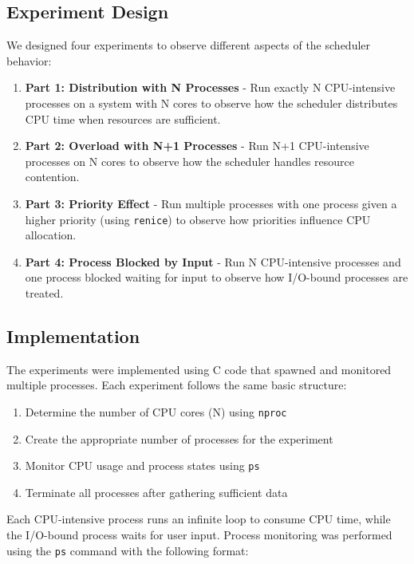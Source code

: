 \documentclass[12pt,a4paper]{article}
\begin{document}
\subsection{Experiment Design}

We designed four experiments to observe different aspects of the scheduler behavior:

\begin{enumerate}
    \item \textbf{Part 1: Distribution with N Processes} - Run exactly N CPU-intensive processes on a system with N cores to observe how the scheduler distributes CPU time when resources are sufficient.
    
    \item \textbf{Part 2: Overload with N+1 Processes} - Run N+1 CPU-intensive processes on N cores to observe how the scheduler handles resource contention.
    
    \item \textbf{Part 3: Priority Effect} - Run multiple processes with one process given a higher priority (using \texttt{renice}) to observe how priorities influence CPU allocation.
    
    \item \textbf{Part 4: Process Blocked by Input} - Run N CPU-intensive processes and one process blocked waiting for input to observe how I/O-bound processes are treated.
\end{enumerate}

\subsection{Implementation}

The experiments were implemented using C code that spawned and monitored multiple processes. Each experiment follows the same basic structure:

\begin{enumerate}
    \item Determine the number of CPU cores (N) using \texttt{nproc}
    \item Create the appropriate number of processes for the experiment
    \item Monitor CPU usage and process states using \texttt{ps}
    \item Terminate all processes after gathering sufficient data
\end{enumerate}

Each CPU-intensive process runs an infinite loop to consume CPU time, while the I/O-bound process waits for user input. Process monitoring was performed using the \texttt{ps} command with the following format:
\end{document}
